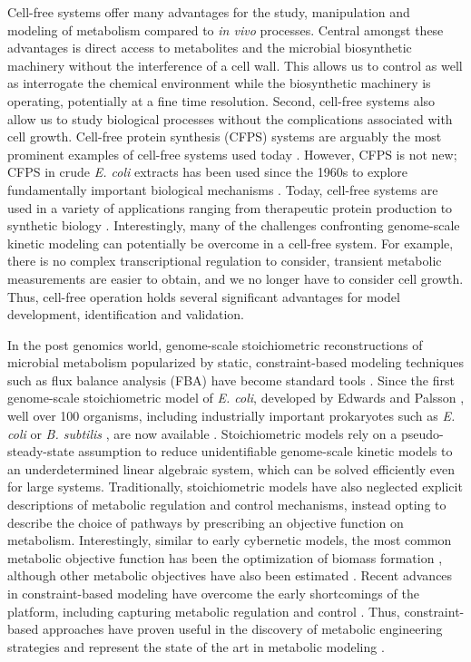 \documentclass[10pt,twocolumn,twoside,final]{IEEEtran}
\begin{document}
Cell-free systems offer many advantages for the study, manipulation and modeling of metabolism compared to \textit{in vivo} processes.
Central amongst these advantages is direct access to metabolites and the microbial biosynthetic machinery without the interference of a cell wall.
This allows us to control as well as interrogate the chemical environment while the biosynthetic machinery is operating, potentially at a fine time resolution.
Second, cell-free systems also allow us to study biological processes without the complications associated with cell growth.
Cell-free protein synthesis (CFPS) systems are arguably the most prominent examples of cell-free systems used today \citep{Jewett:2008aa}.
However, CFPS is not new; CFPS in crude \textit{E. coli} extracts has been used since the 1960s to explore fundamentally important biological mechanisms \citep{MATTHAEI:1961aa,NIRENBERG:1961aa}. Today, cell-free systems are used in a variety of applications ranging from therapeutic protein production \citep{Lu:2014aa} to synthetic biology \citep{Hodgman:2012aa}. Interestingly, many of the challenges confronting genome-scale kinetic modeling can potentially be overcome in a cell-free system. For example, there is no complex transcriptional regulation to consider, transient metabolic measurements are easier to obtain, and we no longer have to consider cell growth. Thus, cell-free operation holds several significant advantages for model development, identification and validation.

In the post genomics world, genome-scale stoichiometric reconstructions of microbial metabolism popularized by static, constraint-based modeling techniques such as flux balance analysis (FBA) have become standard tools \citep{2012_lewis_palsson_NatRevMicrobio}. Since the first genome-scale stoichiometric model of \textit{E. coli}, developed by Edwards and Palsson \citep{2000_edwards_palsson_PNAS}, well over 100 organisms, including industrially important prokaryotes such as \textit{E. coli} \citep{Feist:2007aa} or \textit{B. subtilis} \citep{Oh:2007aa}, are now available \citep{2009_feist_palsson_NatRevMicrobio}. Stoichiometric models rely on a pseudo-steady-state assumption to reduce unidentifiable genome-scale kinetic models to an underdetermined linear algebraic system, which can be solved efficiently even for large systems. Traditionally, stoichiometric models have also neglected explicit descriptions of metabolic regulation and control mechanisms, instead opting to describe the choice of pathways by prescribing an objective function on metabolism. Interestingly, similar to early cybernetic models, the most common metabolic objective function has been the optimization of biomass formation \citep{2002_ibarra_edwards_palsson_Nat}, although other metabolic objectives have also been estimated \citep{2007_schuetz_sauer_MolSysBio}. Recent advances in constraint-based modeling have overcome the early shortcomings of the platform, including capturing metabolic regulation and control \citep{2013_hyduke_lewis_palsson_MolBioSys}. Thus, constraint-based approaches have proven useful in the discovery of metabolic engineering strategies and represent the state of the art in metabolic modeling \citep{2013_mccloskey_palsson_feist_MolSysBio, 2012_zomorrodi_maranas_MetaEng}.
\end{document}
